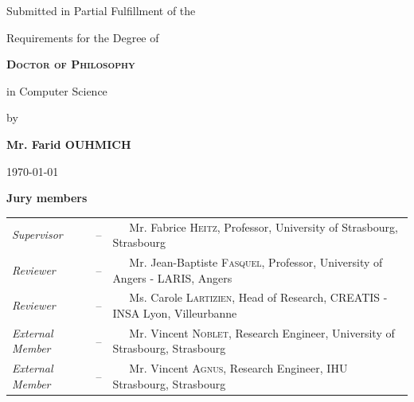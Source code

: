 \begin{titlingpage}
\begin{center}
		\vspace{1\baselineskip}
		
		{\LARGE  Submitted in Partial Fulfillment of the}
		
		{\LARGE Requirements for the Degree of}
		
		\vspace{1\baselineskip}
		
		{\LARGE \textbf \textsc{Doctor of Philosophy}}%
		
		\vspace{0.2cm}
		
		{\LARGE in  Computer Science}
		
		\vspace{0.7\baselineskip}
		
		{\LARGE by}
		
		\vspace{0.5\baselineskip}
		
		{\LARGE \textbf{Mr. Farid OUHMICH}}
		
		\vspace{1\baselineskip}
		
		{\LARGE \textbf \textsc{\thetitle}}
		
		\vspace{1\baselineskip}
	\end{center}
	\vfill
	
	\begin{center}
		\today
	\end{center}
	
	\vspace{1\baselineskip}
	
	\noindent
	\textbf{Jury members}
	
	\begin{tabular}{lcl}
		\textit{Supervisor}& -- &~~~Mr. Fabrice \textsc{Heitz}, Professor, \small University of Strasbourg, Strasbourg\\
		\textit{Reviewer}&-- &~~~Mr. Jean-Baptiste \textsc{Fasquel}, Professor, \small University of  Angers - LARIS, Angers\\
		\textit{Reviewer}& -- &~~~Ms. Carole \textsc{Lartizien}, 
		Head of Research, \small CREATIS - INSA Lyon, Villeurbanne\\
		\textit{External Member}& -- &~~~Mr. Vincent \textsc{Noblet}, 
		Research Engineer, \small University of Strasbourg, Strasbourg\\
		\textit{External Member}& -- &~~~Mr. Vincent \textsc{Agnus}, 
		Research Engineer, \small IHU Strasbourg, Strasbourg\\
	\end{tabular}
	

\end{titlingpage}
